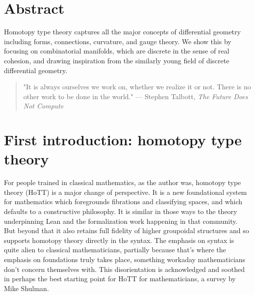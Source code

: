 \maketitle

\bgroup 

\section*{Abstract}\label{abstract}

Homotopy type theory captures all the major concepts of differential
geometry including forms, connections, curvature, and gauge theory. We
show this by focusing on combinatorial manifolds, which are discrete in
the sense of real cohesion\cite{shulman_cohesion}, and drawing
inspiration from the similarly young field of discrete differential
geometry.

\egroup 

\begin{quote}
\centering 

"It is always ourselves we work on, whether we realize it or not. There
is no other work to be done in the world." --- Stephen Talbott,
\emph{The Future Does Not Compute}\cite{talbott}
\end{quote}

\section{First introduction: homotopy type
theory}\label{first-introduction-homotopy-type-theory}

For people trained in classical mathematics, as the author was, homotopy
type theory (HoTT) is a major change of perspective. It is a new
foundational system for mathematics which foregrounds fibrations and
classifying spaces, and which defaults to a constructive philosophy. It
is similar in those ways to the theory underpinning Lean and the
formalization work happening in that community. But beyond that it also
retains full fidelity of higher groupoidal structures and so supports
homotopy theory directly in the syntax. The emphasis on syntax is quite
alien to classical mathematicians, partially because that's where the
emphasis on foundations truly takes place, something workaday
mathematicians don't concern themselves with. This disorientation is
acknowledged and soothed in perhaps the best starting point for HoTT for
mathematicians, a survey by Mike Shulman\cite{shulman_logic_of_space}.

